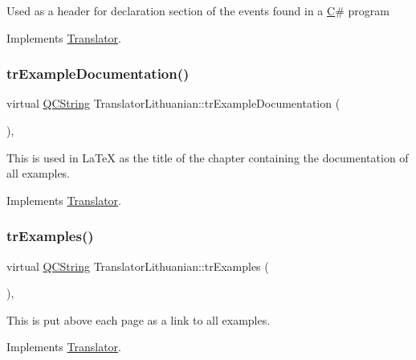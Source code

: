 Used as a header for declaration section of the events found in a \mbox{\hyperlink{class_c}{C}}\# program 

Implements \mbox{\hyperlink{class_translator}{Translator}}.

\mbox{\label{class_translator_lithuanian_ac6b61b9081a98da7f5170e9fed15f45d}} 
\subsubsection{\texorpdfstring{trExampleDocumentation()}{trExampleDocumentation()}}
{\footnotesize\ttfamily virtual \mbox{\hyperlink{class_q_c_string}{Q\+C\+String}} Translator\+Lithuanian\+::tr\+Example\+Documentation (\begin{DoxyParamCaption}{ }\end{DoxyParamCaption})\hspace{0.3cm}{\ttfamily [inline]}, {\ttfamily [virtual]}}

This is used in La\+TeX as the title of the chapter containing the documentation of all examples. 

Implements \mbox{\hyperlink{class_translator}{Translator}}.

\mbox{\label{class_translator_lithuanian_a70bb6bb7d2d0521c1d60e0a7a0d94b7e}} 
\subsubsection{\texorpdfstring{trExamples()}{trExamples()}}
{\footnotesize\ttfamily virtual \mbox{\hyperlink{class_q_c_string}{Q\+C\+String}} Translator\+Lithuanian\+::tr\+Examples (\begin{DoxyParamCaption}{ }\end{DoxyParamCaption})\hspace{0.3cm}{\ttfamily [inline]}, {\ttfamily [virtual]}}

This is put above each page as a link to all examples. 

Implements \mbox{\hyperlink{class_translator}{Translator}}.


